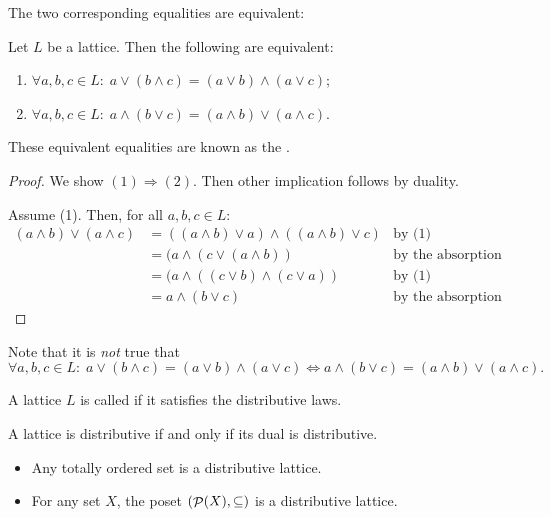 The two corresponding equalities are equivalent:
\begin{proposition} \label{lemma:equivalenceDistributiveLaws}
Let $L$ be a lattice. Then the following are equivalent:
\begin{enumerate}
\item $\forall a,b,c \in L: \; a \vee (b\wedge c) = (a\vee b) \wedge (a\vee c)$;
\item $\forall a,b,c \in L: \; a\wedge (b \vee c) = (a\wedge b)\vee (a\wedge c)$.
\end{enumerate}
\end{proposition}
These equivalent equalities are known as the .
\begin{proof}
We show $(1)\Rightarrow (2)$. Then other implication follows by duality.

Assume (1). Then, for all $a,b,c \in L$:
\begin{align*}
(a\wedge b)\vee (a\wedge c) &= ((a\wedge b)\vee a) \wedge ((a\wedge b)\vee c) & \text{by (1)}\\
&= (a\wedge (c\vee (a\wedge b))  & \text{by the absorption law}\\
&= (a \wedge ((c\vee b) \wedge (c\vee a))  & \text{by (1)}\\
&= a\wedge (b\vee c) & \text{by the absorption law.}
\end{align*}
\end{proof}
Note that it is \emph{not} true that
\[ \forall a,b,c \in L: \; a \vee (b\wedge c) = (a\vee b) \wedge (a\vee c) \iff a\wedge (b \vee c) = (a\wedge b)\vee (a\wedge c). \]

\begin{definition}
A lattice $L$ is called  if it satisfies the distributive laws.
\end{definition}

\begin{lemma}
A lattice is distributive \textup{if and only if} its dual is distributive.
\end{lemma}

\begin{example}
\begin{itemize}
\item Any totally ordered set is a distributive lattice.
\item For any set $X$, the poset $\left( \mathop{\mathcal{P}}(X), \subseteq \right)$ is a distributive lattice.
\end{itemize}
\end{example}

